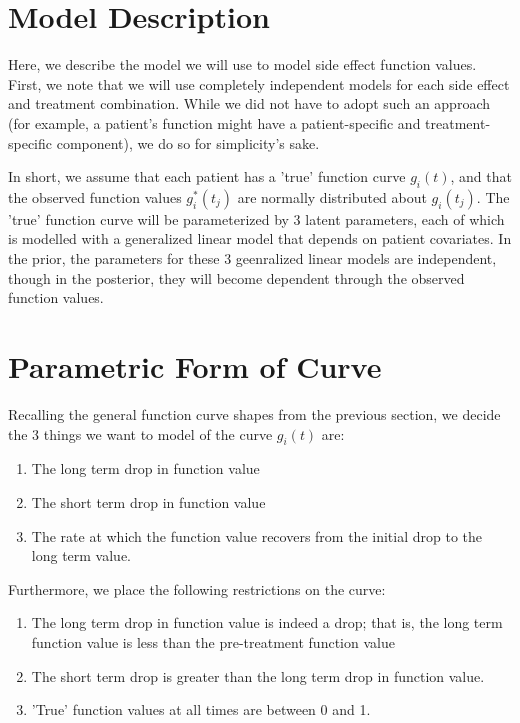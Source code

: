 \section{Model Description}

Here, we describe the model we will use to model side effect function values.  First, we note that we will use completely independent models for each side effect and treatment combination.  While we did not have to adopt such an approach (for example, a patient's function might have a patient-specific and treatment-specific component), we do so for simplicity's sake.

In short, we assume that each patient has a 'true' function curve $g_i(t)$, and that the observed function values $g_i^*(t_j)$ are normally distributed about $g_i(t_j)$.  The 'true' function curve will be parameterized by 3 latent parameters, each of which is modelled with a generalized linear model that depends on patient covariates.  In the prior, the parameters for these 3 geenralized linear models are independent, though in the posterior, they will become dependent through the observed function values.

\section{Parametric Form of Curve}
Recalling the general function curve shapes from the previous section, we decide the 3 things we want to model of the curve $g_i(t)$ are:
\begin{enumerate}
\item The long term drop in function value
\item The short term drop in function value
\item The rate at which the function value recovers from the initial drop to the long term value.
\end{enumerate}

Furthermore, we place the following restrictions on the curve:

\begin{enumerate}
\item The long term drop in function value is indeed a drop;  that is, the long term function value is less than the pre-treatment function value
\item The short term drop is greater than the long term drop in function value.
\item 'True' function values at all times are between 0 and 1.
\end{enumerate}

